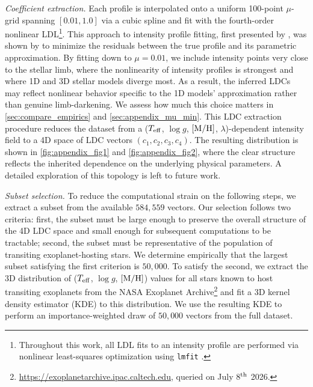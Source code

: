 \documentclass[twocolumn]{aastex631}
\newcommand{\vtwo}[1]{{#1}}
\begin{document}
\textit{Coefficient extraction.} Each profile is interpolated onto a uniform 100-point $\mu$-grid \vtwo{spanning $[0.01, 1.0]$} via a cubic spline and fit with the fourth-order nonlinear LDL\footnote{Throughout this work, all LDL fits to an intensity profile are performed via nonlinear least-squares optimization using \texttt{lmfit} \citep{lmfit}.}. This approach to intensity profile fitting, first presented by \citet{Claret2011}, was shown by \citet[][hereafter ]{Espinoza2015} to minimize the residuals between the true profile and its parametric approximation. 
\vtwo{By fitting down to $\mu = 0.01$, we include intensity points very close to the stellar limb, where the nonlinearity of intensity profiles is strongest and where 1D and 3D stellar models diverge most. As a result, the inferred LDCs may reflect nonlinear behavior specific to the 1D models' approximation rather than genuine limb-darkening. We assess how much this choice matters in \autoref{sec:compare_empirics} and \autoref{sec:appendix_mu_min}.
This LDC extraction procedure reduces} the dataset from a ($T_{\rm eff}$, $\log g$, $[\rm M/\rm H]$, $\lambda$)-dependent intensity field to a 4D space of LDC vectors $(c_1, c_2, c_3, c_4)$. The resulting distribution is shown in \autoref{fig:appendix_fig1} and \autoref{fig:appendix_fig2}, where the clear structure reflects the inherited dependence on the underlying physical parameters. A detailed exploration of this topology is left to future work.

\vtwo{\textit{Subset selection.}
To reduce the computational strain on the following steps, we extract a subset from the available $584{,}559$ vectors. Our selection follows two criteria: first, the subset must be large enough to preserve the overall structure of the 4D LDC space and small enough for subsequent computations to be tractable; second, the subset must be representative of the population of transiting exoplanet-hosting stars. We determine empirically that the largest subset satisfying the first criterion is $50{,}000$. 
To satisfy the second, we extract the 3D distribution of ($T_{\rm eff}$, $\log g$, $[\rm M/\rm H]$) values for all stars known to host transiting exoplanets from the NASA Exoplanet Archive\footnote{\url{https://exoplanetarchive.ipac.caltech.edu}, queried on July 8$^{\rm th}$ 2026.} and fit a 3D kernel density estimator (KDE) to this distribution. We use the resulting KDE to perform an importance-weighted draw of $50{,}000$ vectors from the full dataset.}
\end{document}
